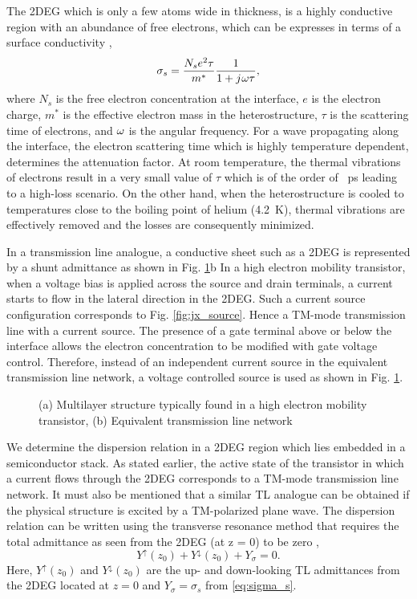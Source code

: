 \documentclass[12pt]{article}
\begin{document}
The 2DEG which is only a few atoms wide in thickness, is a highly conductive region with an abundance of free electrons, which can be expresses in terms of a surface conductivity \cite{Burke2000},
%
\begin{equation}
  \sigma_s = \frac{N_s e^2 \tau}{m^{\ast}}\frac{1}{1 + j\mkern1mu \omega \tau},
  \label{eq:sigma_s}
\end{equation}
%
where $N_s$ is the free electron concentration at the interface, $e$ is the electron charge, $m^{\ast}$ is the effective electron mass in the heterostructure, $\tau$ is the scattering time of electrons, and $\omega$ is the angular frequency. For a wave propagating along the interface, the electron scattering time which is highly temperature dependent, determines the attenuation factor. At room temperature, the thermal vibrations of electrons result in a very small value of $\tau$ which is of the order of \SI{}{\ps} leading to a high-loss scenario. On the other hand, when the heterostructure is cooled to temperatures close to the boiling point of helium (\SI{4.2}{\kelvin}), thermal vibrations are effectively removed and the losses are consequently minimized.

In a transmission line analogue, a conductive sheet such as a 2DEG is represented by a shunt admittance as shown in Fig. \ref{fig:TL_equivalent}b In a high electron mobility transistor, when a voltage bias is applied across the source and drain terminals, a current starts to flow in the lateral direction in the 2DEG. Such a current source configuration corresponds to Fig. \ref{fig:jx_source}. Hence a TM-mode transmission line with a current source. The presence of a gate terminal above or below the interface allows the electron concentration to be modified with gate voltage control. Therefore, instead of an independent current source in the equivalent transmission line network, a voltage controlled source is used as shown in Fig. \ref{fig:TL_equivalent}.
%
\begin{figure}[t!]
  \centering
  \def\svgwidth{\linewidth}
  
  \caption{(a) Multilayer structure typically found in a high electron mobility transistor, (b) Equivalent transmission line network}
  \label{fig:TL_equivalent}
\end{figure}
%

We determine the dispersion relation in a 2DEG region which lies embedded in a semiconductor stack. As stated earlier, the active state of the transistor in which a current flows through the 2DEG corresponds to a TM-mode transmission line network. It must also be mentioned that a similar TL analogue can be obtained if the physical structure is excited by a TM-polarized plane wave. The dispersion relation can be written using the transverse resonance method that requires the total admittance as seen from the 2DEG (at z = 0) to be zero \cite{Gomez-Diaz2012},
%
\begin{equation}
  Y^{\uparrow}(z_0) + Y^{\downarrow}(z_0) + Y_{\sigma} = 0.
  \label{eq:dispersion}
\end{equation}
%
Here, $Y^{\uparrow}(z_0)$ and $Y^{\downarrow}(z_0)$ are the up- and down-looking TL admittances from the 2DEG located at $z = 0$ and $Y_{\sigma} = \sigma_s$ from \eqref{eq:sigma_s}.
\end{document}
